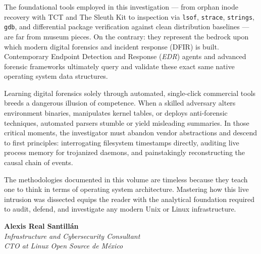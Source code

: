 The foundational tools employed in this investigation --- from orphan inode recovery with TCT and The Sleuth Kit to inspection via \texttt{lsof}, \texttt{strace}, \texttt{strings}, \texttt{gdb}, and differential package verification against clean distribution baselines --- are far from museum pieces. On the contrary: they represent the bedrock upon which modern digital forensics and incident response (DFIR) is built. Contemporary Endpoint Detection and Response (\textit{EDR}) agents and advanced forensic frameworks ultimately query and validate these exact same native operating system data structures.

Learning digital forensics solely through automated, single-click commercial tools breeds a dangerous illusion of competence. When a skilled adversary alters environment binaries, manipulates kernel tables, or deploys anti-forensic techniques, automated parsers stumble or yield misleading summaries. In those critical moments, the investigator must abandon vendor abstractions and descend to first principles: interrogating filesystem timestamps directly, auditing live process memory for trojanized daemons, and painstakingly reconstructing the causal chain of events.

The methodologies documented in this volume are timeless because they teach one to think in terms of operating system architecture. Mastering how this live intrusion was dissected equips the reader with the analytical foundation required to audit, defend, and investigate any modern Unix or Linux infrastructure.

\vspace{1.5em}
\noindent\begin{minipage}{\linewidth}
\raggedleft
\textbf{Alexis Real Santillán}\\[3pt]
\textit{Infrastructure and Cybersecurity Consultant}\\[2pt]
\textit{CTO at Linux Open Source de México}
\end{minipage}
